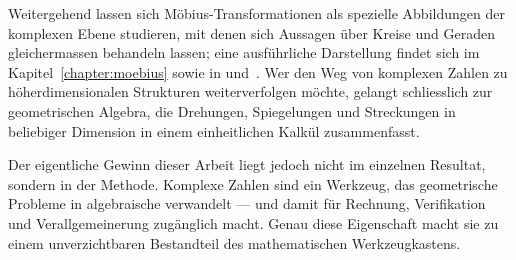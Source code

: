 Weitergehend lassen sich Möbius-Transformationen als spezielle Abbildungen
%
der komplexen Ebene studieren, mit denen sich Aussagen über Kreise und
Geraden gleichermassen behandeln lassen; eine ausführliche Darstellung
findet sich im Kapitel~\ref{chapter:moebius} sowie in \cite{komplex:needham} 
und~\cite{komplex:schwerdtfeger}.
Wer den Weg von komplexen Zahlen zu höherdimensionalen Strukturen
weiterverfolgen möchte, gelangt schliesslich zur geometrischen Algebra,
%
die Drehungen, Spiegelungen und Streckungen in beliebiger Dimension in
einem einheitlichen Kalkül zusammenfasst.

Der eigentliche Gewinn dieser Arbeit liegt jedoch nicht im einzelnen
Resultat, sondern in der Methode.
Komplexe Zahlen sind ein Werkzeug, das geometrische Probleme in
algebraische verwandelt --- und damit für Rechnung, Verifikation und
Verallgemeinerung zugänglich macht.
Genau diese Eigenschaft macht sie zu einem unverzichtbaren Bestandteil
des mathematischen Werkzeugkastens.
